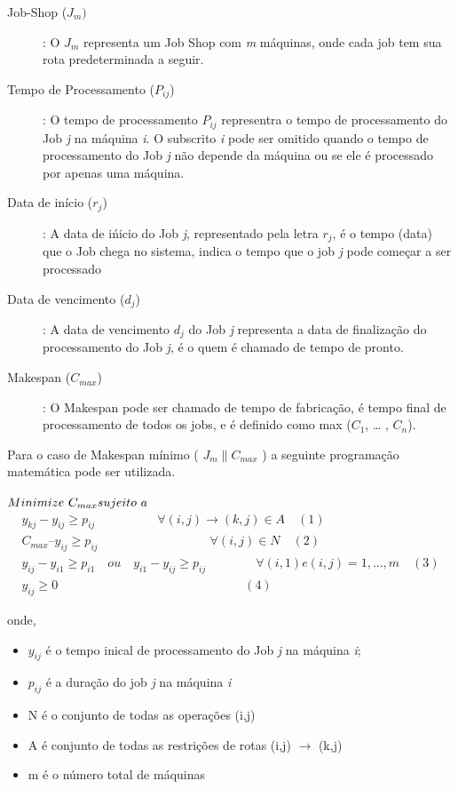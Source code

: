 \begin{description}

\item [Job-Shop ($J_{m})$]: O $J_m$ representa um Job Shop com {\it m} máquinas, onde cada job tem sua rota predeterminada a seguir.

\item [Tempo de Processamento ($P_{ij}$)]: O tempo de processamento $P_{ij}$ representra o tempo de processamento do Job {\it j} na máquina {\it i}. O subscrito {\it i} pode ser omitido quando o tempo de processamento do Job {\it j} não depende da máquina ou se ele é processado por apenas uma máquina.

\item [Data de início ($r_j$)]: A data de ińicio do Job {\it j}, representado pela letra $r_j$, é o tempo (data) que o Job chega no sistema, indica o tempo que o job {\it j} pode começar a ser processado

\item [Data de vencimento ($d_j$)]: A data de vencimento $d_j$ do Job {\it j} representa a data de finalização do processamento do Job {\it j}, é o quem é chamado de tempo de pronto.

\item [Makespan ($C_{max}$)]: O Makespan pode ser chamado de tempo de fabricação, é tempo final de processamento de todos os jobs, e é definido como max ($C_1$, … , $C_n$).
\end{description}

Para o caso de Makespan mínimo ( $J_m \parallel C_{max}$ ) a seguinte programação matemática pode ser utilizada.

$\\Minimize\ C_{max}\\ \\
sujeito\ a$
\begin{eqnarray*}
        y_{kj}-y_{ij}\geq p_{ij} \qquad \qquad \quad \forall (i,j) \rightarrow (k,j) \in A  \quad (1)\\
        C_{max} – y_{ij}\geq p_{ij} \qquad \qquad \qquad \qquad \quad \forall (i,j) \in N \quad (2)\\
        y_{ij}-y_{i1}\geq p_{i1}\quad ou \quad y_{i1}-y_{ij}\geq p_{ij} \qquad \qquad\forall(i,1) e (i,j) = 1, ..., m \quad (3) \\
         y_{ij}\geq 0 \qquad \qquad \quad \qquad \qquad \qquad \qquad \qquad (4)
\end{eqnarray*}

onde,
\begin{itemize}

\item $y_{ij}$ é o tempo inical de processamento do Job {\it j} na máquina {\it i};
\item $p_{ij}$ é a duração do job {\it j} na máquina {\it i}
\item N é o conjunto de todas as operações (i,j)
\item A é conjunto de todas as restrições de rotas (i,j) $\rightarrow$ (k,j)
\item m é o número total de máquinas

\end{itemize}

